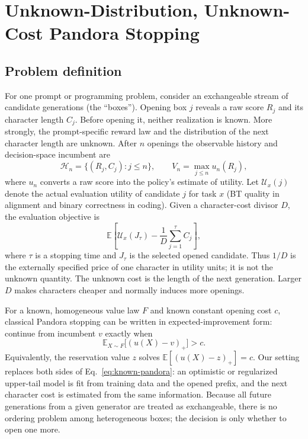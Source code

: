 
\section{Unknown-Distribution, Unknown-Cost Pandora Stopping}
\label{sec:pandora-algorithms}

\subsection{Problem definition}

For one prompt or programming problem, consider an exchangeable stream of
candidate generations (the ``boxes'').  Opening box $j$ reveals a raw score
$R_j$ and its character length $C_j$.  Before opening it, neither realization
is known.  More strongly, the prompt-specific reward law and the distribution
of the next character length are unknown.  After $n$ openings the observable
history and decision-space incumbent are
\begin{equation}
  \mathcal H_n=\{(R_j,C_j):j\le n\},
  \qquad
  V_n=\max_{j\le n}u_n(R_j),
\end{equation}
where $u_n$ converts a raw score into the policy's estimate of utility.  Let
$\mathcal U_x(j)$ denote the actual evaluation utility of candidate $j$ for
task $x$ (BT quality in alignment and binary correctness in coding).  Given a
character-cost divisor $D$, the evaluation objective is
\begin{equation}
  \mathbb E\!\left[
    \mathcal U_x(J_\tau)-\frac{1}{D}\sum_{j=1}^{\tau}C_j
  \right],
  \label{eq:pandora-objective}
\end{equation}
where $\tau$ is a stopping time and $J_\tau$ is the selected opened candidate.
Thus $1/D$ is the externally specified price of one character in utility
units; it is not the unknown quantity.  The unknown cost is the length of the
next generation.  Larger $D$ makes characters cheaper and normally induces
more openings.

For a known, homogeneous value law $F$ and known constant opening cost $c$,
classical Pandora stopping can be written in expected-improvement form:
continue from incumbent $v$ exactly when
\begin{equation}
  \mathbb E_{X\sim F}\big[(u(X)-v)_+\big]>c.
  \label{eq:known-pandora}
\end{equation}
Equivalently, the reservation value $z$ solves
$\mathbb E[(u(X)-z)_+]=c$.  Our setting replaces both sides of
Eq.~\eqref{eq:known-pandora}: an optimistic or regularized upper-tail model is
fit from training data and the opened prefix, and the next character cost is
estimated from the same information.  Because all future generations from a
given generator are treated as exchangeable, there is no ordering problem
among heterogeneous boxes; the decision is only whether to open one more.


